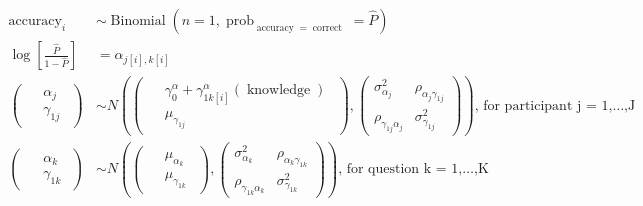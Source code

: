 \documentclass[10pt]{article}
\begin{document}
$$
\begin{aligned}
  \operatorname{accuracy}_{i}  &\sim \operatorname{Binomial}(n = 1, \operatorname{prob}_{\operatorname{accuracy} = \operatorname{correct}} = \widehat{P}) \\
    \log\left[\frac{\hat{P}}{1 - \hat{P}} \right] &=\alpha_{j[i],k[i]} \\
\left(
  \begin{array}{c}
    \begin{aligned}
      &\alpha_{j} \\
      &\gamma_{1j}
    \end{aligned}
  \end{array}
\right)
  &\sim N \left(
\left(
  \begin{array}{c}
    \begin{aligned}
      &\gamma_{0}^{\alpha} + \gamma_{1k[i]}^{\alpha}(\operatorname{knowledge}) \\
      &\mu_{\gamma_{1j}}
    \end{aligned}
  \end{array}
\right)
,
\left(
  \begin{array}{cc}
     \sigma^2_{\alpha_{j}} & \rho_{\alpha_{j}\gamma_{1j}} \\
     \rho_{\gamma_{1j}\alpha_{j}} & \sigma^2_{\gamma_{1j}}
  \end{array}
\right)
 \right)
    \text{, for participant j = 1,} \dots \text{,J} \\
\left(
  \begin{array}{c}
    \begin{aligned}
      &\alpha_{k} \\
      &\gamma_{1k}
    \end{aligned}
  \end{array}
\right)
  &\sim N \left(
\left(
  \begin{array}{c}
    \begin{aligned}
      &\mu_{\alpha_{k}} \\
      &\mu_{\gamma_{1k}}
    \end{aligned}
  \end{array}
\right)
,
\left(
  \begin{array}{cc}
     \sigma^2_{\alpha_{k}} & \rho_{\alpha_{k}\gamma_{1k}} \\
     \rho_{\gamma_{1k}\alpha_{k}} & \sigma^2_{\gamma_{1k}}
  \end{array}
\right)
 \right)
    \text{, for question k = 1,} \dots \text{,K}
\end{aligned}
$$
\end{document}
